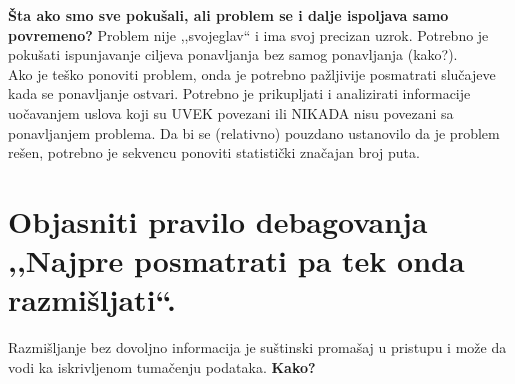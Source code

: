 \documentclass[a4paper]{article}
\begin{document}
  \textbf{Šta ako smo sve pokušali, ali problem se i dalje ispoljava samo povremeno?} Problem
  nije ,,svojeglav`` i ima svoj precizan uzrok. Potrebno je pokušati ispunjavanje ciljeva ponavljanja
  bez samog ponavljanja (kako?). \\
  \indent Ako je teško ponoviti problem, onda je potrebno pažljivije posmatrati slučajeve
  kada se ponavljanje ostvari. Potrebno je prikupljati i analizirati informacije uočavanjem
  uslova koji su UVEK povezani ili NIKADA nisu povezani sa ponavljanjem problema. Da bi se
  (relativno) pouzdano ustanovilo da je problem rešen, potrebno je sekvencu ponoviti statistički
  značajan broj puta.

\section{Objasniti pravilo debagovanja ,,Najpre posmatrati pa tek onda razmišljati``.}
  Razmišljanje bez dovoljno informacija je suštinski promašaj u pristupu i može da vodi 
  ka iskrivljenom tumačenju podataka. \textbf{Kako?}
\end{document}
